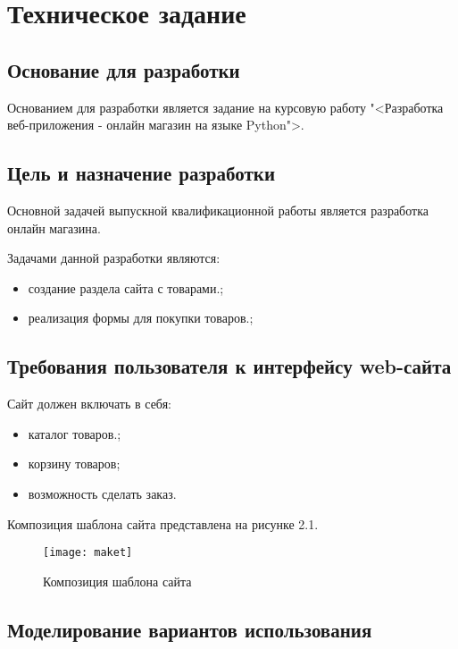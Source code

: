 \section{Техническое задание}
\subsection{Основание для разработки}

Основанием для разработки является задание на курсовую работу "<Разработка веб-приложения - онлайн магазин на языке Python">.

\subsection{Цель и назначение разработки}

Основной задачей выпускной квалификационной работы является 
разработка онлайн магазина.

Задачами данной разработки являются:
\begin{itemize}
\item создание раздела сайта с товарами.;
\item реализация формы для покупки товаров.;
\end{itemize}

\subsection{Требования пользователя к интерфейсу web-сайта}

Сайт должен включать в себя:
\begin{itemize}
    \item каталог товаров.;
    \item корзину товаров;
    \item возможность сделать заказ.
\end{itemize}

Композиция шаблона сайта представлена на рисунке 2.1.

\begin{figure}[ht]
\texttt{[image: maket]}
\caption{Композиция шаблона сайта}
\label{maket:image}
\end{figure}

\subsection{Моделирование вариантов использования}

